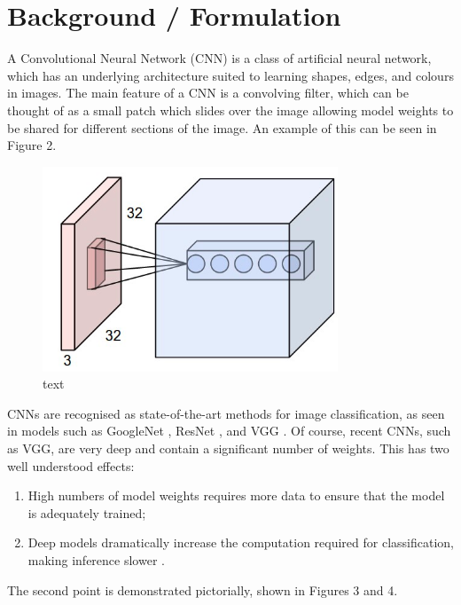 \documentclass[10pt,journal,compsoc]{IEEEtran}
\begin{document}
		\section{Background / Formulation}
		A Convolutional Neural Network (CNN) is a class of artificial neural network, which has an underlying architecture suited to learning shapes, edges, and colours in images. The main feature of a CNN is a convolving filter, which can be thought of as a small patch which slides over the image allowing model weights to be shared for different sections of the image. An example of this can be seen in Figure 2.\\
		\begin{figure}[h]
			\centering
			\includegraphics[scale=0.4]{CNN}
			\caption{text}
		\end{figure}
		
		CNNs are recognised as state-of-the-art methods for image classification, as seen in models such as GoogleNet \cite{Szegedy:2014}, ResNet \cite{He:2015}, and VGG \cite{Simonyan:2015}. Of course, recent CNNs, such as VGG, are very deep and contain a significant number of weights. This has two well understood effects:
		\begin{enumerate}
			\item High numbers of model weights requires more data to ensure that the model is adequately trained;
			\item Deep models dramatically increase the computation required for classification, making inference slower \cite{Cansiani:2017}.
		\end{enumerate}
		
		The second point is demonstrated pictorially, shown in Figures 3 and 4.
		
\end{document}
